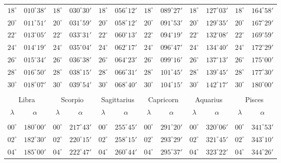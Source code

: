 \begin{table}[!h]
{\begin{tabular}{cc|cc|cc|cc|cc|cc}
$18^\circ$ & $010^\circ38'$ & $18^\circ$ & $030^\circ30'$ & $18^\circ$ & $056^\circ12'$ & $18^\circ$ & $089^\circ27'$ & $18^\circ$ & $127^\circ03'$ & $18^\circ$ & $164^\circ58'$\\
$20^\circ$ & $011^\circ51'$ & $20^\circ$ & $031^\circ59'$ & $20^\circ$ & $058^\circ12'$ & $20^\circ$ & $091^\circ53'$ & $20^\circ$ & $129^\circ35'$ & $20^\circ$ & $167^\circ29'$\\
$22^\circ$ & $013^\circ05'$ & $22^\circ$ & $033^\circ31'$ & $22^\circ$ & $060^\circ13'$ & $22^\circ$ & $094^\circ19'$ & $22^\circ$ & $132^\circ08'$ & $22^\circ$ & $169^\circ59'$\\
$24^\circ$ & $014^\circ19'$ & $24^\circ$ & $035^\circ04'$ & $24^\circ$ & $062^\circ17'$ & $24^\circ$ & $096^\circ47'$ & $24^\circ$ & $134^\circ40'$ & $24^\circ$ & $172^\circ29'$\\
$26^\circ$ & $015^\circ34'$ & $26^\circ$ & $036^\circ38'$ & $26^\circ$ & $064^\circ23'$ & $26^\circ$ & $099^\circ16'$ & $26^\circ$ & $137^\circ13'$ & $26^\circ$ & $175^\circ00'$\\
$28^\circ$ & $016^\circ50'$ & $28^\circ$ & $038^\circ15'$ & $28^\circ$ & $066^\circ31'$ & $28^\circ$ & $101^\circ45'$ & $28^\circ$ & $139^\circ45'$ & $28^\circ$ & $177^\circ30'$\\
$30^\circ$ & $018^\circ07'$ & $30^\circ$ & $039^\circ54'$ & $30^\circ$ & $068^\circ40'$ & $30^\circ$ & $104^\circ15'$ & $30^\circ$ & $142^\circ17'$ & $30^\circ$ & $180^\circ00'$\\
\multicolumn{12}{c}{}\\
\multicolumn{2}{c}{Libra}\vline & \multicolumn{2}{c}{Scorpio} \vline& \multicolumn{2}{c}{Sagittarius} \vline& \multicolumn{2}{c}{Capricorn}\vline &
\multicolumn{2}{c}{Aquarius}\vline & \multicolumn{2}{c}{Pisces}\\\hline
$\lambda$& $\alpha$& $\lambda$& $\alpha$& $\lambda$& $\alpha$& $\lambda$& $\alpha$& $\lambda$& $\alpha$& $\lambda$& $\alpha$\\\hline
&&&&&&&&&&&\\[-2ex]
$00^\circ$ & $180^\circ00'$ & $00^\circ$ & $217^\circ43'$ & $00^\circ$ & $255^\circ45'$ & $00^\circ$ & $291^\circ20'$ &  $00^\circ$ & $320^\circ06'$ & $00^\circ$ & $341^\circ53'$\\
$02^\circ$ & $182^\circ30'$ & $02^\circ$ & $220^\circ15'$ & $02^\circ$ & $258^\circ15'$ & $02^\circ$ & $293^\circ29'$ &  $02^\circ$ & $321^\circ45'$ & $02^\circ$ & $343^\circ10'$\\
$04^\circ$ & $185^\circ00'$ & $04^\circ$ & $222^\circ47'$ & $04^\circ$ & $260^\circ44'$ & $04^\circ$ & $295^\circ37'$ &  $04^\circ$ & $323^\circ22'$ & $04^\circ$ & $344^\circ26'$\\

\end{tabular}}
\end{table}
